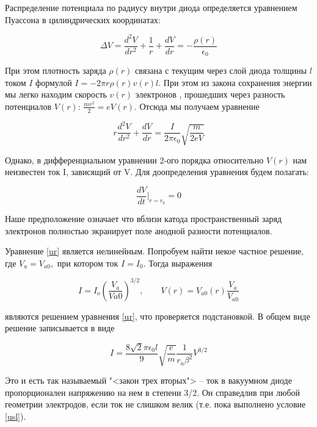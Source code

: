 \documentclass[12pt]{kiarticle}
\begin{document}
Распределение потенциала по радиусу внутри диода определяется уравнением Пуассона в цилиндрических координатах:

\begin{equation}\label{}
\Delta V = \dfrac{d^2V}{dr^2} + \dfrac{1}{r} + \dfrac{dV}{dr} = - \dfrac{\rho(r)}{\epsilon_0}
\end{equation}

При этом плотность заряда $ \rho(r) $ связана с текущим через слой диода толщины $ l $ током $ I $ формулой $ I = -2\pi r \rho(r)v(r)l$. При этом из закона сохранения энергии мы легко находим скорость $ v(r) $ электронов , прошедших через разность потенциалов $ V(r) $: $ \frac{mv^2}{2} = eV(r) $.  Отсюда мы получаем уравнение 

\begin{equation}\label{ur}
r \dfrac{d^2V}{dr^2} + \dfrac{dV}{dr} = \dfrac{I}{2\pi\epsilon_0}\sqrt{\dfrac{m}{2eV}}
\end{equation}

Однако, в дифференциальном уравнении 2-ого порядка относительно $ V(r) $ нам неизвестен ток I, зависящий от V. Для доопределения уравнения будем полагать:

\begin{equation}\label{usl}
\dfrac{dV}{dt}\bigg |_{r=r_k} = 0
\end{equation} 

Наше предположение означает что вблизи катода пространственный заряд электронов полностью экранирует поле анодной разности потенциалов.

Уравнение \eqref{ur} является нелинейным. Попробуем  найти некое частное решение, где $ V_a = V_{a0}, $ при котором ток $ I = I_0 $. Тогда выражения 

\begin{equation}\label{}
I = I_o \left( \dfrac{V_a}{V{a0}} \right) ^{3/2}, \qquad V(r) = V_{a0}(r)\dfrac{V_a}{V_{a0}}
\end{equation}

являются решением уравнения \eqref{ur}, что проверяется подстановкой. В общем виде решение записывается в виде

\begin{equation}\label{3/2}
I = \dfrac{8\sqrt{2}\pi \epsilon_0 l}{9}\sqrt{\dfrac{e}{m}}\dfrac{1}{r_a\beta^2} V^{3/2}
\end{equation}

Это и есть так называемый "<закон трех вторых"> -- ток в вакуумном диоде пропорционален напряжению на нем в степени 3/2. Он справедлив при любой геометрии электродов, если ток не слишком велик (т.е. пока выполнено условие \eqref{usl}). 
\end{document}
